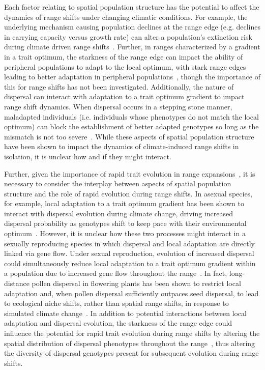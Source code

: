 \documentclass[11pt]{article}
\begin{document}
Each factor relating to spatial population structure has the potential to affect the dynamics of range shifts under changing climatic conditions. For example, the underlying mechanism causing population declines at the range edge (e.g. declines in carrying capacity versus growth rate) can alter a population's extinction risk during climate driven range shifts~\citep{henry2013eco}. Further, in ranges characterized by a gradient in a trait optimum, the starkness of the range edge can impact the ability of peripheral populations to adapt to the local optimum, with stark range edges leading to better adaptation in peripheral populations~\citep{garcia1997genetic}, though the importance of this for range shifts has not been investigated. Additionally, the nature of dispersal can interact with adaptation to a trait optimum gradient to impact range shift dynamics. When dispersal occurs in a stepping stone manner, maladapted individuals (i.e. individuals whose phenotypes do not match the local optimum) can block the establishment of better adapted genotypes so long as the mismatch is not too severe~\citep{atkins2010local}. While these aspects of spatial population structure have been shown to impact the dynamics of climate-induced range shifts in isolation, it is unclear how and if they might interact. 

Further, given the importance of rapid trait evolution in range expansions~\citep{weiss2017rapid, ochocki2017rapid, szHucs2017rapid, shaw2015dispersal, phillips2015evolutionary}, it is necessary to consider the interplay between aspects of spatial population structure and the role of rapid evolution during range shifts. In asexual species, for example, local adaptation to a trait optimum gradient has been shown to interact with dispersal evolution during climate change, driving increased dispersal probability as genotypes shift to keep pace with their environmental optimum~\citep{hargreaves2015fitness}. However, it is unclear how these two processes might interact in a sexually reproducing species in which dispersal and local adaptation are directly linked via gene flow. Under sexual reproduction, evolution of increased dispersal could simultaneously reduce local adaptation to a trait optimum gradient within a population due to increased gene flow throughout the range~\citep{garcia1997genetic, kirkpatrick1997evolution}. In fact, long-distance pollen dispersal in flowering plants has been shown to restrict local adaptation and, when pollen dispersal sufficiently outpaces seed dispersal, to lead to ecological niche shifts, rather than spatial range shifts, in response to simulated climate change~\citep{aguilee2016pollen}. In addition to potential interactions between local adaptation and dispersal evolution, the starkness of the range edge could influence the potential for rapid trait evolution during range shifts by altering the spatial distribution of dispersal phenotypes throughout the range~\citep{henry2013eco, hargreaves2014evolution}, thus altering the diversity of dispersal genotypes present for subsequent evolution during range shifts.
\end{document}
